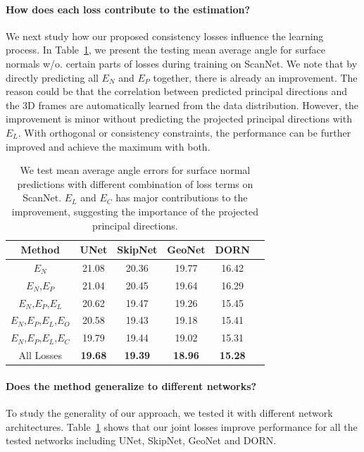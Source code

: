 \paragraph{How does each loss contribute to the estimation?}
We next study how our proposed consistency losses influence the learning process. In Table~\ref{tab:framenet-consistency}, we present the testing mean average angle for surface normals w/o. certain parts of losses during training on ScanNet. We note that by directly predicting all $E_N$ and $E_P$ together, there is already an improvement. The reason could be that the correlation between predicted principal directions and the 3D frames are automatically learned from the data distribution. However, the improvement is minor without predicting the projected principal directions with $E_L$. With orthogonal or consistency constraints, the performance can be further improved and achieve the maximum with both.
\begin{table}
    \centering
    \tabcolsep=0.20cm
    \small
    \begin{tabular}{|c|c|c|c|c|c|}
        \hline
         Method & UNet & SkipNet & GeoNet & DORN\\
         \hline
         $E_N$ & 21.08 & 20.36 & 19.77 & 16.42\\
         \hline
         $E_N$,$E_P$ & 21.04 & 20.45 & 19.64 & 16.29\\
         \hline
         $E_N$,$E_P$,$E_L$ & 20.62 & 19.47 & 19.26 & 15.45\\
         \hline
         $E_N$,$E_P$,$E_L$,$E_O$ & 20.58 & 19.43 & 19.18 & 15.41\\
         \hline
         $E_N$,$E_P$,$E_L$,$E_C$ & 19.79 & 19.44 & 19.02 & 15.31\\
         \hline
         All Losses & \textbf{19.68} & \textbf{19.39} & \textbf{18.96} & \textbf{15.28}\\
         \hline
    \end{tabular}
    \caption{We test mean average angle errors for surface normal predictions with different combination of loss terms on ScanNet. $E_L$ and $E_C$ has major contributions to the improvement, suggesting the importance of the projected principal directions.}
    \label{tab:framenet-consistency}
\end{table}

\vspace{-0.1in}
\paragraph{Does the method generalize to different networks?}  To study the generality of our approach, we tested it with different network architectures.   Table~\ref{tab:framenet-consistency} shows that our joint losses improve performance for all the tested networks including UNet\cite{ronneberger2015u}, SkipNet\cite{bansal2016marr}, GeoNet\cite{qi2018geonet} and DORN\cite{fu2018deep}.

